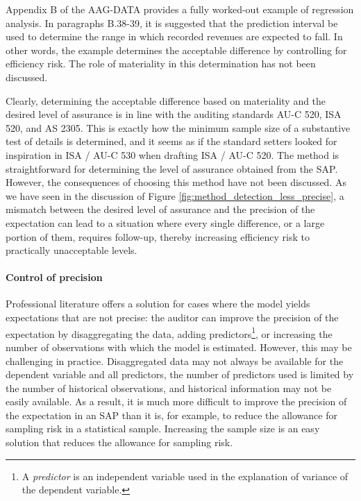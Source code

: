 Appendix B of the AAG-DATA provides a fully worked-out example of regression analysis. In paragraphs B.38-39, it is suggested that the prediction interval be used to determine the range in which recorded revenues are expected to fall. In other words, the example determines the acceptable difference by controlling for efficiency risk. The role of materiality in this determination has not been discussed.

Clearly, determining the acceptable difference based on materiality and the desired level of assurance is in line with the auditing standards AU-C 520, ISA 520, and AS 2305. This is exactly how the minimum sample size of a substantive test of details is determined, and it seems as if the standard setters looked for inspiration in ISA / AU-C 530 when drafting ISA / AU-C 520. The method is straightforward for determining the level of assurance obtained from the SAP. However, the consequences of choosing this method have not been discussed. As we have seen in the discussion of Figure \ref{fig:method_detection_less_precise}, a mismatch between the desired level of assurance and the precision of the expectation can lead to a situation where every single difference, or a large portion of them, requires follow-up, thereby increasing efficiency risk to practically unacceptable levels.

\paragraph{Control of precision} Professional literature offers a solution for cases where the model yields expectations that are not precise: the auditor can improve the precision of the expectation by disaggregating the data, adding predictors\footnote{A \textit{predictor} is an independent variable used in the explanation of variance of the dependent variable.}, or increasing the number of observations with which the model is estimated. However, this may be challenging in practice. Disaggregated data may not always be available for the dependent variable and all predictors, the number of predictors used is limited by the number of historical observations, and historical information may not be easily available. As a result, it is much more difficult to improve the precision of the expectation in an SAP than it is, for example, to reduce the allowance for sampling risk in a statistical sample. Increasing the sample size is an easy solution that reduces the allowance for sampling risk.

